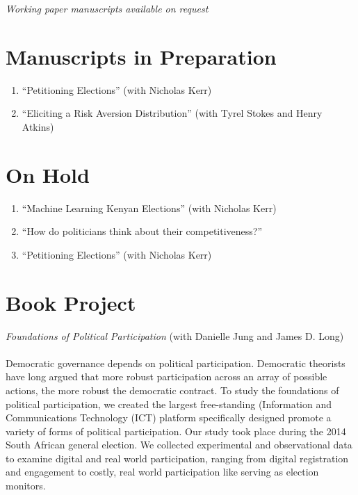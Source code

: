 \documentclass[margin,line]{res}
\begin{document}
{\begin{resume}
\begin{enumerate}
\end{enumerate}
\centerline{\emph{Working paper manuscripts available on request}}


\section{\sc Manuscripts in Preparation}
\renewcommand{\labelenumi}{MP\theenumi.}

\begin{enumerate}
\item ``Petitioning Elections'' (with Nicholas Kerr)
 \item  ``Eliciting a Risk Aversion Distribution'' (with Tyrel Stokes
   and Henry Atkins)

\end{enumerate}

\section{\sc On Hold}
\renewcommand{\labelenumi}{MP\theenumi.}

\begin{enumerate}
\item ``Machine Learning Kenyan Elections'' (with Nicholas Kerr)
\item ``How do politicians think about their competitiveness?''
\item ``Petitioning Elections'' (with Nicholas Kerr)
\end{enumerate}


\section{\sc Book Project}
\emph{Foundations of Political Participation} (with Danielle Jung and
James D. Long)\\
\\
Democratic governance depends on political
 participation. Democratic theorists have long argued that more
  robust participation across an array of possible actions, the more
  robust the democratic contract. To study the foundations of
  political participation, we created the largest free-standing
  (Information and Communications Technology (ICT) platform
  specifically designed promote a variety of forms of political
  participation. Our study took place during the 2014 South African
  general election. We collected experimental and observational data
  to examine digital and real world participation, ranging from
  digital registration and engagement to costly, real world
  participation like serving as election monitors.



\end{resume}}
\end{document}
